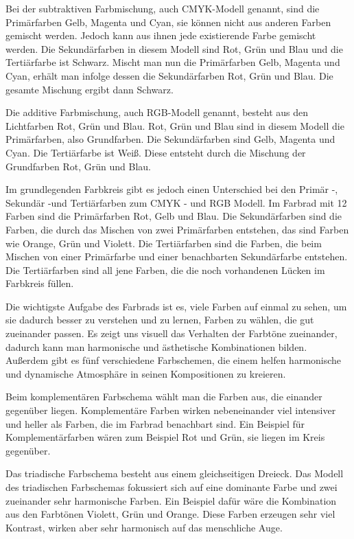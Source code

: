 Bei der subtraktiven Farbmischung, auch CMYK-Modell genannt, sind die Primärfarben Gelb, Magenta und Cyan, sie können nicht aus anderen Farben gemischt werden. Jedoch kann aus ihnen jede existierende Farbe gemischt werden. Die Sekundärfarben in diesem Modell sind Rot, Grün und Blau und die Tertiärfarbe ist Schwarz. Mischt man nun die Primärfarben Gelb, Magenta und Cyan, erhält man infolge dessen die Sekundärfarben Rot, Grün und Blau. Die gesamte Mischung ergibt dann Schwarz.

Die additive Farbmischung, auch RGB-Modell genannt, besteht aus den Lichtfarben Rot, Grün und Blau. Rot, Grün und Blau sind in diesem Modell die Primärfarben, also Grundfarben. Die Sekundärfarben sind Gelb, Magenta und Cyan. Die Tertiärfarbe ist Weiß. Diese entsteht durch die Mischung der Grundfarben Rot, Grün und Blau.

Im grundlegenden Farbkreis gibt es jedoch einen Unterschied bei den Primär -, Sekundär -und Tertiärfarben zum CMYK - und RGB Modell. Im Farbrad mit 12 Farben sind die Primärfarben Rot, Gelb und Blau. Die Sekundärfarben sind die Farben, die durch das Mischen von zwei Primärfarben entstehen, das sind Farben wie Orange, Grün und Violett. Die Tertiärfarben sind die Farben, die beim Mischen von einer Primärfarbe und einer benachbarten Sekundärfarbe entstehen. Die Tertiärfarben sind all jene Farben, die die noch vorhandenen Lücken im Farbkreis füllen.


Die wichtigste Aufgabe des Farbrads ist es, viele Farben auf einmal zu sehen, um sie dadurch besser zu verstehen und zu lernen, Farben zu wählen, die gut zueinander passen. Es zeigt uns visuell das Verhalten der Farbtöne zueinander, dadurch kann man harmonische und ästhetische Kombinationen bilden.
Außerdem gibt es fünf verschiedene Farbschemen, die einem helfen harmonische und dynamische Atmosphäre in seinen Kompositionen zu kreieren.

Beim komplementären Farbschema wählt man die Farben aus, die einander gegenüber liegen. Komplementäre Farben wirken nebeneinander viel intensiver und heller als Farben, die im Farbrad benachbart sind. Ein Beispiel für Komplementärfarben wären zum Beispiel Rot und Grün, sie liegen im Kreis gegenüber.

Das triadische Farbschema besteht aus einem gleichseitigen Dreieck. Das Modell des triadischen Farbschemas fokussiert sich auf eine dominante Farbe und zwei zueinander sehr harmonische Farben. Ein Beispiel dafür wäre die Kombination aus den Farbtönen Violett, Grün und Orange. Diese Farben erzeugen sehr viel Kontrast, wirken aber sehr harmonisch auf das menschliche Auge. 

